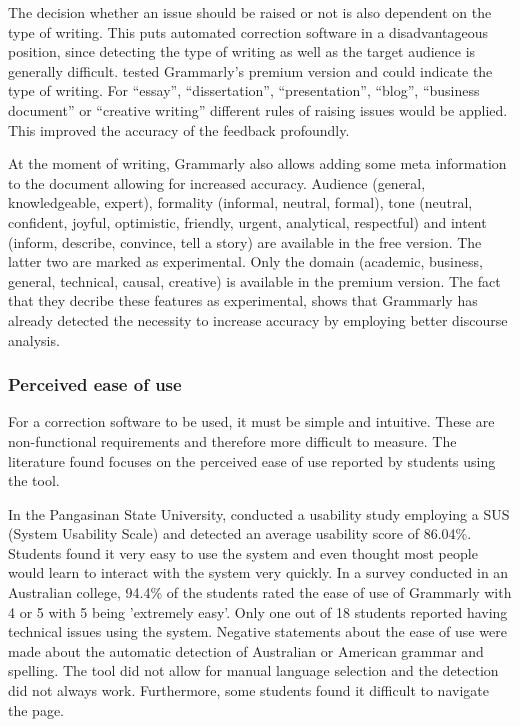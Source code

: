 \documentclass[runningheads]{llncs}
\let\OldTextregistered\textregistered
\renewcommand{\textregistered}{\OldTextregistered\xspace}
\begin{document}
The decision whether an issue should be raised or not is also dependent on the type of writing. This puts automated correction software in a disadvantageous position, since detecting the type of writing as well as the target audience is generally difficult. \textcite{cavaleri_you_2016} tested Grammarly\textregistered's premium version and could indicate the type of writing. For ``essay'', ``dissertation'', ``presentation'', ``blog'', ``business document'' or ``creative writing'' different rules of raising issues would be applied. This improved the accuracy of the feedback profoundly.

At the moment of writing, Grammarly\textregistered also allows adding some meta information to the document allowing for increased accuracy. Audience (general, knowledgeable, expert), formality (informal, neutral, formal), tone (neutral, confident, joyful, optimistic, friendly, urgent, analytical, respectful) and intent (inform, describe, convince, tell a story) are available in the free version. The latter two are marked as experimental. Only the domain (academic, business, general, technical, causal, creative) is available in the premium version. The fact that they decribe these features as experimental, shows that Grammarly\textregistered has already detected the necessity to increase accuracy by employing better discourse analysis.

\subsubsection{Perceived ease of use}
For a correction software to be used, it must be simple and intuitive. These are non-functional requirements and therefore more difficult to measure. The literature found focuses on the perceived ease of use reported by students using the tool.

In the Pangasinan State University, \textcite{ventayen_graduate_2018} conducted a usability study employing a SUS (System Usability Scale) and detected an average usability score of 86.04\%. Students found it very easy to use the system and even thought most people would learn to interact with the system very quickly. In a survey \citep{cavaleri_you_2016} conducted in an Australian college, 94.4\% of the students rated the ease of use of Grammarly\textregistered with 4 or 5 with 5 being 'extremely easy'. Only one out of 18 students reported having technical issues using the system. Negative statements about the ease of use were made about the automatic detection of Australian or American grammar and spelling. The tool did not allow for manual language selection and the detection did not always work. Furthermore, some students found it difficult to navigate the page.
\end{document}
